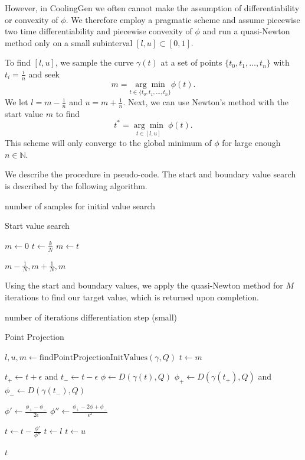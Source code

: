 \documentclass[a4paper, 11pt]{report}
\theoremstyle{definition}
\newcommand{\Desc}[2]{\State \makebox[12em][l]{#1}#2}
\begin{document}
	However, in CoolingGen we often cannot make the assumption of differentiability or convexity of $\phi$. We therefore employ a pragmatic scheme and assume piecewise two time differentiability and piecewise convexity of $\phi$ and run a quasi-Newton method only on a small subinterval $[l,u] \subset [0,1]$.

	To find $[l,u]$, we sample the curve $\gamma(t)$ at a set of points $\{t_0, t_1, \ldots, t_n\}$ with $t_i = \frac{i}{n}$ and seek
		$$ m = \underset{t\in\{t_0, t_1, \ldots, t_n\}}{\arg\min} \phi(t). $$
	We let $l = m - \frac{1}{n}$ and $u = m + \frac{1}{n}$. Next, we can use Newton's method with the start value $m$ to find
		$$ t^* = \underset{t\in[l,u]}{\arg\min}\;\phi(t). $$
	This scheme will only converge to the global minimum of $\phi$ for large enough $n \in \mathbb{N}$.

	We describe the procedure in pseudo-code. The start and boundary value search is described by the following algorithm.
	\begin{algorithm}[H]
		\begin{algorithmic}[1]
			\Input
				\Desc{$N$}{number of samples for initial value search}
			\EndInput
			
			\caption{Start value search}

				\State $m \gets 0$
					\State $t \gets \frac{k}{N}$
						$m \gets t$
					\EndIf
				\EndFor

				\State \Return $m-\frac{1}{N}, m+\frac{1}{N}, m$
			\EndProcedure
		\end{algorithmic}
	\end{algorithm}
	Using the start and boundary values, we apply the quasi-Newton method for $M$ iterations to find our target value, which is returned upon completion.
	\begin{algorithm}[H]
		\begin{algorithmic}[1]
			\Input
				\Desc{$M$}{number of iterations}
				\Desc{$\epsilon > 0$}{differentiation step (small)}
			\EndInput

			\caption{Point Projection}\label{alg:pointinversion}
			\Procedure{pointProjection}{$\gamma, Q$}
				\State $l, u, m \gets \text{findPointProjectionInitValues}(\gamma, Q)$
				\State $t \gets m$

				\For {$k = 1, 2,\ldots, M$}
					\State $t_+ \gets t + \epsilon$ and $t_- \gets t - \epsilon$
					\State $\phi \gets D(\gamma(t), Q)$
					\State $\phi_+ \gets D(\gamma(t_+), Q)$ and $\phi_- \gets D(\gamma(t_-), Q)$

					\State $\phi' \gets \frac{\phi_+ - \phi_-}{2\epsilon}$
					\State $\phi'' \gets \frac{\phi_+ - 2\phi + \phi_-}{\epsilon^2}$
					
					\State $t \gets t - \frac{\phi'}{\phi''}$
					 $t \gets l$ \EndIf
					 $t \gets u$ \EndIf

				\EndFor

				\State \Return $t$
			\EndProcedure
		\end{algorithmic}
	\end{algorithm}
\end{document}
